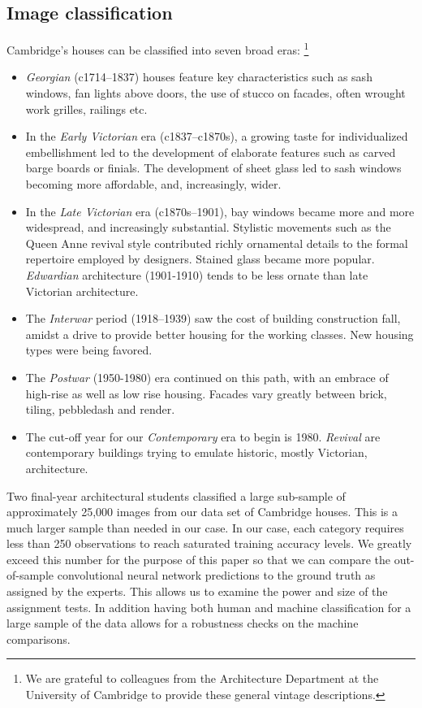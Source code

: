 \documentclass[]{article}
\let\rmarkdownfootnote\footnote%
\def\footnote{\protect\rmarkdownfootnote}
\begin{document}
\hypertarget{image-classification}{%
\subsection{Image classification}\label{image-classification}}

Cambridge's houses can be classified into seven broad eras:
\footnote{We are grateful to colleagues from the Architecture Department at the University of Cambridge to provide these general vintage descriptions.}

\begin{itemize}
\item
  \emph{Georgian} (c1714--1837) houses feature key characteristics such
  as sash windows, fan lights above doors, the use of stucco on facades,
  often wrought work grilles, railings etc.\label{def_eras}
\item
  In the \emph{Early Victorian} era (c1837--c1870s), a growing taste for
  individualized embellishment led to the development of elaborate
  features such as carved barge boards or finials. The development of
  sheet glass led to sash windows becoming more affordable, and,
  increasingly, wider.
\item
  In the \emph{Late Victorian} era (c1870s--1901), bay windows became
  more and more widespread, and increasingly substantial. Stylistic
  movements such as the Queen Anne revival style contributed richly
  ornamental details to the formal repertoire employed by designers.
  Stained glass became more popular. \emph{Edwardian} architecture
  (1901-1910) tends to be less ornate than late Victorian architecture.
\item
  The \emph{Interwar} period (1918--1939) saw the cost of building
  construction fall, amidst a drive to provide better housing for the
  working classes. New housing types were being favored.
\item
  The \emph{Postwar} (1950-1980) era continued on this path, with an
  embrace of high-rise as well as low rise housing. Facades vary greatly
  between brick, tiling, pebbledash and render.
\item
  The cut-off year for our \emph{Contemporary} era to begin is 1980.
  \emph{Revival} are contemporary buildings trying to emulate historic,
  mostly Victorian, architecture.
\end{itemize}

Two final-year architectural students classified a large sub-sample of
approximately 25,000 images from our data set of Cambridge houses. This
is a much larger sample than needed in our case. In our case, each
category requires less than 250 observations to reach saturated training
accuracy levels. We greatly exceed this number for the purpose of this
paper so that we can compare the out-of-sample convolutional neural
network predictions to the ground truth as assigned by the experts. This
allows us to examine the power and size of the assignment tests. In
addition having both human and machine classification for a large sample
of the data allows for a robustness checks on the machine comparisons.
\end{document}
